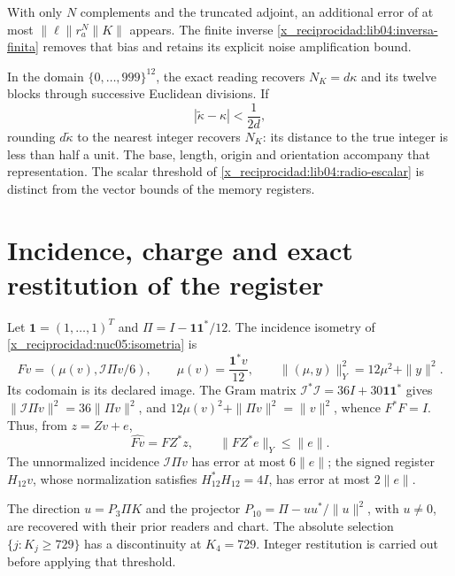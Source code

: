With only \(N\) complements and the truncated adjoint, an additional
error of at most \(\|\ell\|r_a^N\|K\|\) appears. The finite inverse
\eqref{x_reciprocidad:lib04:inversa-finita} removes that bias and retains its explicit
noise amplification bound.

In the domain \(\{0,\ldots,999\}^{12}\), the exact reading
recovers \(N_K=d\kappa\) and its twelve blocks through successive Euclidean
divisions. If
\begin{equation}
 |\widetilde\kappa-\kappa|<\frac1{2d},
 \label{x_reciprocidad:lib04:radio-escalar}
\end{equation}
rounding \(d\widetilde\kappa\) to the nearest integer
recovers \(N_K\): its distance to the true integer is less than
half a unit. The base, length, origin and orientation accompany
that representation. The scalar threshold of
\eqref{x_reciprocidad:lib04:radio-escalar} is distinct from the vector bounds
of the memory registers.

\section{Incidence, charge and exact restitution of the register}
\label{x_reciprocidad:lib04:incidencia}

Let \(\mathbf1=(1,\ldots,1)^T\) and
\(\Pi=I-\mathbf1\mathbf1^*/12\). The incidence isometry of
\cref{x_reciprocidad:nuc05:isometria} is
\begin{equation}
 Fv=(\mu(v),\mathcal I\Pi v/6),\qquad
 \mu(v)=\frac{\mathbf1^*v}{12},\qquad
 \|(\mu,y)\|_Y^2=12\mu^2+\|y\|^2.
 \label{x_reciprocidad:lib04:f-incidencia}
\end{equation}
Its codomain is its declared image. The Gram matrix
\(\mathcal I^*\mathcal I=36I+30\mathbf1\mathbf1^*\) gives
\(\|\mathcal I\Pi v\|^2=36\|\Pi v\|^2\), and
\(12\mu(v)^2+\|\Pi v\|^2=\|v\|^2\), whence \(F^*F=I\).
Thus, from \(z=Zv+e\),
\begin{equation}
 \widehat{Fv}=FZ^*z,\qquad \|FZ^*e\|_Y\leq\|e\|.
 \label{x_reciprocidad:lib04:error-incidencia}
\end{equation}
The unnormalized incidence \(\mathcal I\Pi v\) has error at
most \(6\|e\|\); the signed register \(H_{12}v\), whose
normalization satisfies \(H_{12}^*H_{12}=4I\), has error at most
\(2\|e\|\).

The direction \(u=P_3\Pi K\) and the projector
\(P_{10}=\Pi-uu^*/\|u\|^2\), with \(u\neq0\), are recovered
with their prior readers and chart. The absolute selection
\(\{j:K_j\geq729\}\) has a discontinuity at \(K_4=729\).
Integer restitution is carried out before applying that threshold.

